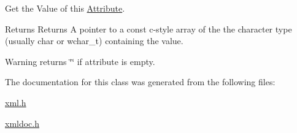 Get the Value of this \hyperlink{classphys_1_1xml_1_1Attribute}{Attribute}. 

\begin{DoxyReturn}{Returns}
Returns A pointer to a const c-\/style array of the the character type (usually char or wchar\_\-t) containing the value. 
\end{DoxyReturn}
\begin{DoxyWarning}{Warning}
returns \char`\"{}\char`\"{} if attribute is empty. 
\end{DoxyWarning}


The documentation for this class was generated from the following files:\begin{DoxyCompactItemize}
\item 
\hyperlink{xml_8h}{xml.h}\item 
\hyperlink{xmldoc_8h}{xmldoc.h}\end{DoxyCompactItemize}
